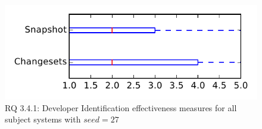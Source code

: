 
\begin{figure}
\centering
\includegraphics[height=0.4\textheight]{figures/dit_seed/rq1_tiny_27}
\caption{RQ 3.4.1: Developer Identification effectiveness measures for all subject systems with $seed=27$}
\label{fig:dit_seed:rq1:tiny}
\end{figure}
